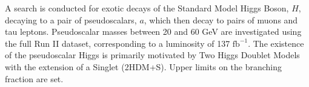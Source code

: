 A search is conducted for exotic decays of the Standard Model Higgs Boson, $H$, decaying to a pair of pseudoscalars, $a$, which then decay to pairs of muons and tau leptons. Pseudoscalar masses between 20 and 60 GeV are investigated using the full Run II dataset, corresponding to a luminosity of 137 $\text{fb}^{-1}$. The existence of the pseudoscalar Higgs is primarily motivated by Two Higgs Doublet Models with the extension of a Singlet (2HDM+S). Upper limits on the branching fraction are set.
